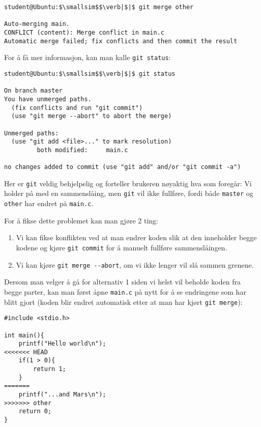 \begin{alphasection}
\begin{lstlisting}[mathescape=true]
student@Ubuntu:$\smallsim$$\verb|$|$ git merge other

Auto-merging main.
CONFLICT (content): Merge conflict in main.c
Automatic merge failed; fix conflicts and then commit the result
\end{lstlisting}

For å få mer informasjon, kan man kalle \verb|git status|:

\begin{lstlisting}[mathescape=true]
student@Ubuntu:$\smallsim$$\verb|$|$ git status

On branch master
You have unmerged paths.
  (fix conflicts and run "git commit")
  (use "git merge --abort" to abort the merge)
  
Unmerged paths:
  (use "git add <file>..." to mark resolution)
         both modified:     main.c

no changes added to commit (use "git add" and/or "git commit -a")
\end{lstlisting}

Her er \verb|git| veldig behjelpelig og forteller brukeren nøyaktig hva som foregår: Vi holder på med en sammenslåing, men \verb|git| vil ikke fullføre, fordi både \verb|master| og \verb|other| har endret på \verb|main.c|.

For å fikse dette problemet kan man gjøre 2 ting:

\begin{enumerate}
    \item Vi kan fikse konflikten ved at man endrer koden slik at den inneholder begge kodene og kjøre \verb|git commit| for å manuelt fullføre sammenslåingen.
    \item Vi kan kjøre \verb|git merge --abort|, om vi ikke lenger vil slå sammen grenene. 
\end{enumerate}


Dersom man velger å gå for alternativ 1 siden vi helst vil beholde koden fra begge parter, kan man først åpne \verb|main.c| på nytt for å se endringene som har blitt gjort (koden blir endret automatisk etter at man har kjørt \verb|git merge|):

\begin{lstlisting}
#include <stdio.h>

int main(){
	printf("Hello world\n");
<<<<<<< HEAD
	if(1 > 0){
		return 1;
	}
=======
	printf("...and Mars\n");
>>>>>>> other
	return 0;
}
\end{lstlisting}


\end{alphasection}
